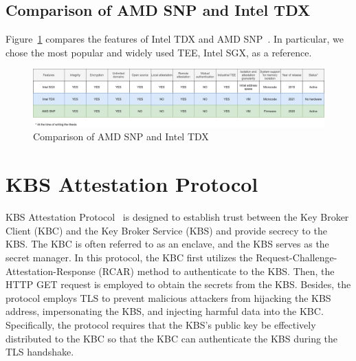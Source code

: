 \subsection{Comparison of AMD SNP and Intel TDX}
Figure~\ref{fig:snp_tdx_compare} compares the features of Intel TDX and AMD SNP~\cite*{amd_sev_summarize}. In particular, we chose the most popular and widely used TEE, Intel SGX, 
as a reference.

\begin{figure}[htp]
  \centering
  \includegraphics[width=1\textwidth]{images/snp_tdx_compare.png}
  \caption[Comparison of AMD SNP and Intel TDX]{Comparison of AMD SNP and Intel TDX}
  \label{fig:snp_tdx_compare}
\end{figure}




\section{KBS Attestation Protocol}
\label{sec:kbs}

KBS Attestation Protocol~\cite*{kbs_Attestation_protocol} is designed to establish trust between the Key Broker Client (KBC) and the Key Broker Service (KBS) and provide secrecy to the KBS.  The KBC is often referred to as an enclave, and the KBS serves as the secret manager. In this protocol, the KBC first utilizes the 
Request-Challenge-Attestation-Response (RCAR) method to authenticate to the KBS. Then, the HTTP GET request is employed to obtain the secrets from the KBS. Besides, the protocol employs TLS to prevent malicious attackers from hijacking the KBS address,  impersonating the KBS,  and injecting harmful 
data into the KBC. Specifically, the protocol requires that the KBS's public key be effectively distributed to the KBC so that the KBC can authenticate the KBS during the TLS handshake.

